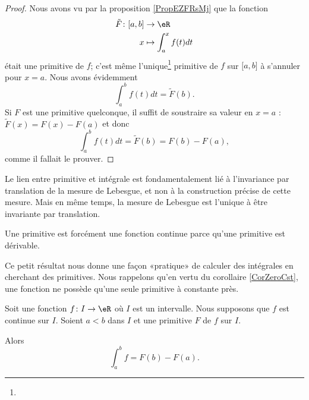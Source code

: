 \begin{proof}
    Nous avons vu par la proposition \ref{PropEZFRsMj} que la fonction
    \begin{equation}
        \begin{aligned}
            \tilde F\colon \mathopen[ a , b \mathclose]&\to \eR \\
            x&\mapsto  \int_a^xf(t)dt
        \end{aligned}
    \end{equation}
    était une primitive de \( f\); c'est même l'unique\footnote{} primitive de \( f\) sur \( \mathopen[ a , b \mathclose]\) à s'annuler pour \( x=a\). Nous avons évidemment
    \begin{equation}
        \int_a^bf(t)dt=\tilde F(b).
    \end{equation}
    Si \( F\) est une primitive quelconque, il suffit de soustraire sa valeur en \( x=a\) : \( \tilde F(x)=F(x)-F(a)\) et donc
    \begin{equation}
        \int_a^bf(t)dt=\tilde F(b)=F(b)-F(a),
    \end{equation}
    comme il fallait le prouver.
\end{proof}

\begin{remark}
    Le lien entre primitive et intégrale est fondamentalement lié à l'invariance par translation de la mesure de Lebesgue, et non à la construction précise de cette mesure. Mais en même temps, la mesure de Lebesgue est l'unique à être invariante par translation.
\end{remark}

\begin{remark}
    Une primitive est forcément une fonction continue parce qu'une primitive est dérivable.
\end{remark}

Ce petit résultat nous donne une façon «pratique» de calculer des intégrales en cherchant des primitives. Nous rappelons qu'en vertu du corollaire \ref{CorZeroCst}, une fonction ne possède qu'une seule primitive à constante près.

\begin{corollary}       \label{CORooKRBZooEMDobC}
    Soit une fonction \( f\colon I\to \eR\) où \( I\) est un intervalle. Nous supposons que \( f\) est continue sur \( I\). Soient \( a<b\) dans \( I\) et une primitive \( F\) de \( f\) sur \( I\).

    Alors
    \begin{equation}        \label{EQooXEKDooEnWcbn}
        \int_a^bf=F(b)-F(a).
    \end{equation}
\end{corollary}

